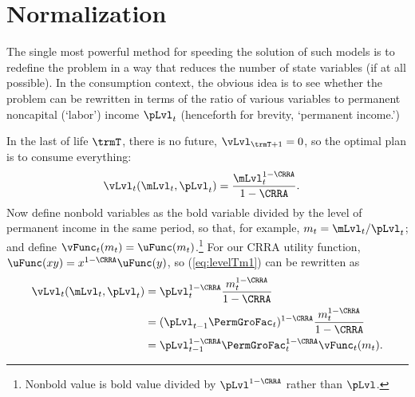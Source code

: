 \hypertarget{normalization}{}
\section{Normalization}\label{sec:normalization}

The single most powerful method for speeding the solution of such models is to redefine the problem in a way that reduces the number of state variables (if at all possible).  In the consumption context, the obvious idea is to see whether the problem can be rewritten in terms of the ratio of various variables to permanent noncapital (`labor') income $\pLvl_{\prd}$ (henceforth for brevity, `permanent income.')


In the last {\interval} of life $\trmT$, there is no future, $\vLvl_{\trmT+1} = 0$, so the optimal plan is to consume everything:
\begin{equation}\begin{gathered}\begin{aligned}
      \vLvl_{\prdT}(\mLvl_{\prdT},\pLvl_{\prdT})  & = \frac{\mLvl_{\prdT}^{1-\CRRA}}{1-\CRRA}. \label{eq:levelTm1}
    \end{aligned}\end{gathered}\end{equation}
Now define nonbold variables as the bold variable divided by the level of permanent income in the same period, so that, for example, $m_{\prdT}=\mLvl_{\prdT}/\pLvl_{\prdT}$; and define $\vFunc_{\prdT}(m_{\prdT}) = \uFunc(m_{\prdT})$.\footnote{Nonbold value is bold value divided by $\pLvl^{1-\CRRA}$ rather than $\pLvl$.}  For our CRRA utility function, $\uFunc(xy)=x^{1-\CRRA}\uFunc(y)$, so (\ref{eq:levelTm1}) can be rewritten as
\begin{equation}\begin{gathered}\begin{aligned}
      \vLvl_{\prdT}(\mLvl_{\prdT},\pLvl_{\prdT}) & = \pLvl_{\prdT}^{1-\CRRA}\frac{{m}_{\prdT}^{1-\CRRA}}{1-\CRRA}                       \\
                                                & = (\pLvl_{\prdT-1}\PermGroFac_{\prdT})^{1-\CRRA}\frac{{m}_{\prdT}^{1-\CRRA}}{1-\CRRA} \\
                                                &= \pLvl_{\prdT-1}^{1-\CRRA}\PermGroFac_{\prdT}^{1-\CRRA}\vFunc_{\prdT}(m_{\prdT}). \label{eq:vT}
    \end{aligned}\end{gathered}\end{equation}

